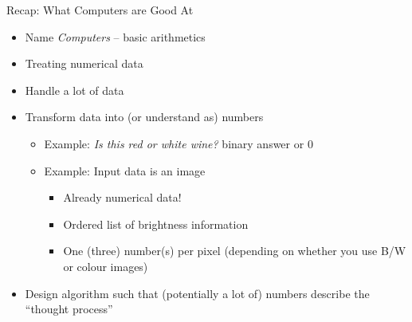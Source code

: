 \begin{frame}{Recap: What Computers are Good At}
%
\begin{itemize}
\item Name \emph{Computers} -- basic arithmetics
\item Treating numerical data
\item Handle a lot of data
\item[\Thus] Transform data into (or understand as) numbers
	\begin{itemize}
	\item Example: \emph{Is this red or white wine?} \thus binary answer  or 0
	\item Example: Input data is an image
		\begin{itemize}
		\item Already numerical data!
		\item Ordered list of brightness information
		\item One (three) number(s) per pixel (depending on whether you use B/W or colour images)
		\end{itemize}
	\end{itemize}
\item[\Thus] Design algorithm such that (potentially a lot of) numbers describe the \enquote{thought process}
\end{itemize}
%
\end{frame}



